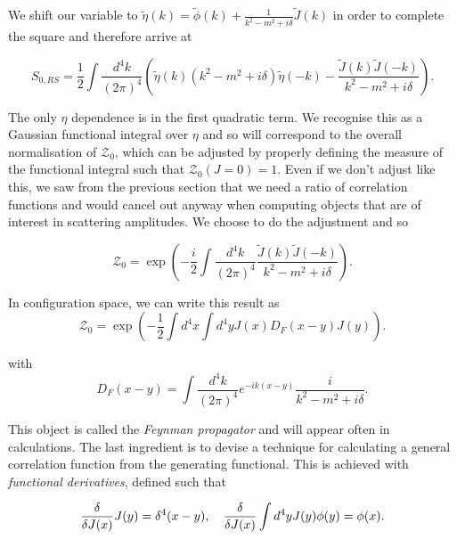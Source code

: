 We shift our variable to $\tilde{\eta}(k) = \tilde{\phi}(k) + \frac{1}{k^2 - m^2 + i \delta}\tilde{J}(k)$ in order to complete the square and therefore arrive at

\begin{equation}
S_{0, RS} = \frac{1}{2} \int \frac{d^4 k}{(2 \pi)^4} \left(\tilde{\eta}(k)(k^2 - m^2 + i \delta) \tilde{\eta}(-k) - \frac{\tilde{J}(k)\tilde{J}(-k)}{k^2 - m^2 + i \delta} \right).
\end{equation}

The only $\eta$ dependence is in the first quadratic term. We recognise this as a Gaussian functional integral over $\eta$ and so will correspond to the overall normalisation of $\mathcal{Z}_0$, which can be adjusted by properly defining the measure of the functional integral such that $\mathcal{Z}_0(J = 0) = 1$. Even if we don't adjust like this, we saw from the previous section that we need a ratio of correlation functions and would cancel out anyway when computing objects that are of interest in scattering amplitudes. We choose to do the adjustment and so 

\begin{equation}
\mathcal{Z}_0 = \exp \left( -\frac{i}{2} \int \frac{d^4 k}{(2 \pi)^4} \frac{\tilde{J}(k) \tilde{J}(-k)}{k^2 - m^2 + i \delta} \right).
\end{equation}

In configuration space, we can write this result as
\begin{equation}
\mathcal{Z}_0 = \exp \left( -\frac{1}{2} \int d^4 x \int d^4 y  J(x) D_F(x - y) J(y) \right).
\end{equation}

with
\begin{equation}
D_F(x - y) = \int \frac{d^4 k}{(2 \pi)^4} e^{-i k (x - y)} \frac{i}{k^2 - m^2 + i \delta}.
\end{equation}

This object is called the \emph{Feynman propagator} and will appear often in calculations. The last ingredient is to devise a technique for calculating a general correlation function from the generating functional. This is achieved with \emph{functional derivatives}, defined such that

\begin{equation}
\frac{\delta}{\delta J(x)}J(y) = \delta^4(x - y), \hspace{10 pt} \frac{\delta}{\delta J(x)} \int d^4 y J(y) \phi(y) = \phi(x).
\end{equation}

